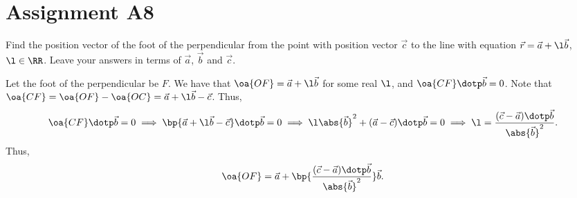 \clearpage
\section{Assignment A8}

\begin{problem}
    Find the position vector of the foot of the perpendicular from the point with position vector $\vec c$ to the line with equation $\vec r = \vec a + \l \vec b$, $\l \in \RR$. Leave your answers in terms of $\vec a$, $\vec b$ and $\vec c$.
\end{problem}
\begin{solution}
    Let the foot of the perpendicular be $F$. We have that $\oa{OF} = \vec a + \l \vec b$ for some real $\l$, and $\oa{CF} \dotp \vec b = 0$. Note that $\oa{CF} = \oa{OF} - \oa{OC} = \vec a + \l \vec b - \vec c$. Thus, \[\oa{CF} \dotp \vec b = 0 \implies \bp{\vec a + \l \vec b - \vec c} \dotp \vec b = 0 \implies \l \abs{\vec b}^2 + (\vec a - \vec c) \dotp \vec b = 0 \implies \l = \frac{(\vec c - \vec a) \dotp \vec b}{\abs{\vec b}^2}.\] Thus, \[\oa{OF} = \vec a + \bp{\frac{(\vec c - \vec a) \dotp \vec b}{\abs{\vec b}^2}} \vec b.\]
\end{solution}

